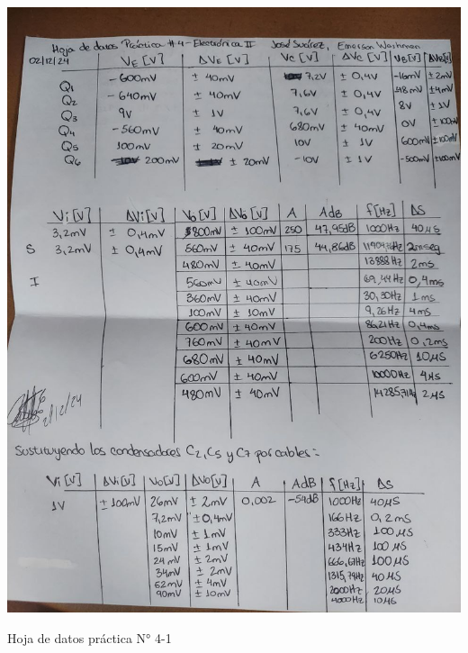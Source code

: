 \begin{ilustracion}[ht]
    \centering
    \includegraphics[width=1.0\textwidth]{src/images/p4/p4-hoja-de-datos-1.jpg}
    \caption{Hoja de datos práctica N° 4-1}
    \label{ilus:hoja-de-datos-p4-1}
\end{ilustracion}

